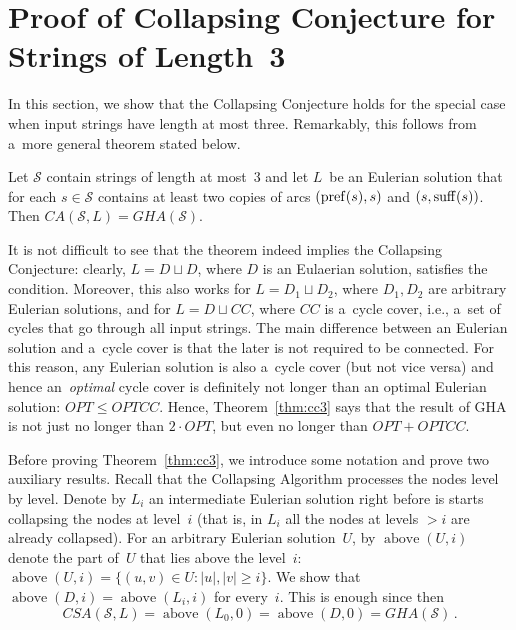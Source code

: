 \section{Proof of Collapsing Conjecture for Strings of Length~3}
\label{subsec:scs3}
In this section, we show that the Collapsing Conjecture holds for 
the special case
when input strings have length at most three. 
Remarkably, this follows from a~more general theorem stated below.

\begin{theorem}\label{thm:cc3}
Let $\mathcal{S}$ contain strings of length at most~3 and let $L$~be an Eulerian solution that for each $s \in \mathcal{S}$ contains at least two copies of arcs $(\operatorname{pref}(s), s)$ and $(s, \operatorname{suff}(s))$. Then $CA(\mathcal{S}, L)=GHA(\mathcal{S})$.
\end{theorem}

It is not difficult to see that the theorem indeed implies the Collapsing Conjecture: clearly, $L=D \sqcup D$, where $D$ is an Eulaerian solution, satisfies the condition. Moreover, this also works for $L=D_1 \sqcup D_2$, where $D_1, D_2$ are arbitrary Eulerian solutions, and for $L=D \sqcup CC$, where $CC$ is a~cycle cover, i.e., a~set of cycles that go through all input strings. The main difference between an Eulerian solution and a~cycle cover is that the later is not required to be connected. For this reason, any Eulerian solution is also a~cycle cover (but not vice versa) and hence an~{\em optimal} cycle cover is definitely not longer than an optimal Eulerian solution: $OPT \le OPTCC$. Hence, Theorem~\ref{thm:cc3} says that the result of GHA is not just no longer than $2\cdot OPT$, but even no longer than $OPT+OPTCC$.

Before proving Theorem~\ref{thm:cc3}, we introduce some notation and 
prove two auxiliary results. Recall that the Collapsing Algorithm processes the nodes level by level. Denote by $L_i$ an intermediate Eulerian solution right before is starts collapsing the nodes at level~$i$ (that is, in $L_i$ all the nodes at levels $>i$ are already collapsed). 
For an arbitrary Eulerian solution~$U$, by $\operatorname{above}(U,i)$ denote the part of~$U$ that lies above the level~$i$: 
$\operatorname{above}(U,i)=\{(u, v) \in U \colon |u|, |v| \ge i\}$.
We show that $\operatorname{above}(D,i)=\operatorname{above}(L_i, i)$ for every~$i$. This is enough since then \[CSA(\mathcal{S}, L)=\operatorname{above}(L_0,0)=\operatorname{above}(D,0)=GHA(\mathcal{S}) \, .\]


